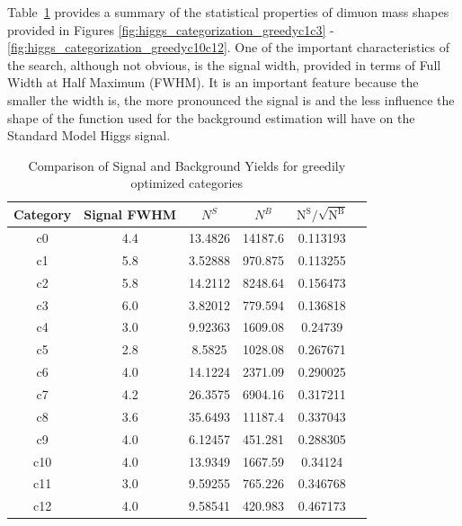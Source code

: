 
Table~\ref{tab:higgs_categorization_yields} provides a summary of the statistical properties of dimuon mass shapes provided in Figures \ref{fig:higgs_categorization_greedyc1c3} - \ref{fig:higgs_categorization_greedyc10c12}. One of the important characteristics of the search, although not obvious, is the signal width, provided in terms of Full Width at Half Maximum (FWHM). It is an important feature because the smaller the width is, the more pronounced the signal is and the less influence the shape of the function used for the background estimation will have on the Standard Model Higgs signal.
\begin{table}[htb]
  \caption{Comparison of Signal and Background Yields for greedily optimized categories}
  \label{tab:higgs_categorization_yields}
  \begin{center}
    \begin{tabular}{|c|c|c|c|c|c|}
      \hline
      Category  & Signal FWHM & $N^{S}$ & $N^{B}$ & $\mathrm{N^S / \sqrt{N^B}}$ \\
      \hline
      c0 & 4.4 & 13.4826 & 14187.6 & 0.113193\\
      c1 & 5.8 & 3.52888 & 970.875 & 0.113255\\
      c2 & 5.8 & 14.2112 & 8248.64 & 0.156473\\
      c3 & 6.0 & 3.82012 & 779.594 & 0.136818\\
      c4 & 3.0 & 9.92363 & 1609.08 & 0.24739\\
      c5 & 2.8 & 8.5825  & 1028.08 & 0.267671\\
      c6 & 4.0 & 14.1224 & 2371.09 & 0.290025\\
      c7 & 4.2 & 26.3575 & 6904.16 & 0.317211\\
      c8 & 3.6 & 35.6493 & 11187.4 & 0.337043\\
      c9 & 4.0 & 6.12457 & 451.281 & 0.288305\\
      c10 & 4.0 & 13.9349 & 1667.59 & 0.34124\\
      c11 & 3.0 & 9.59255 & 765.226 & 0.346768\\
      c12 & 4.0 & 9.58541 & 420.983 & 0.467173\\
      \hline
    \end{tabular}
  \end{center}
\end{table}


